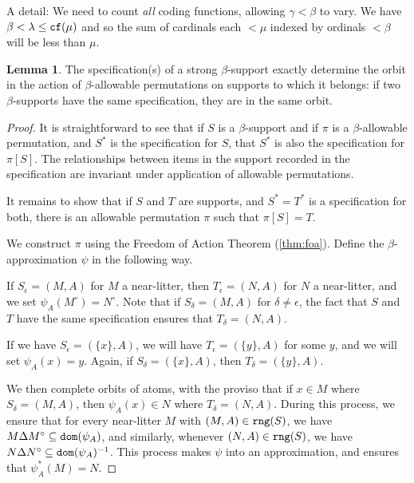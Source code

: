 \documentclass[112pt]{article}
\theoremstyle{definition}
\newtheorem{lemma}[theorem]{Lemma}
\theoremstyle{remark}
\newcommand{\hsuggest}[1]{{\color{magenta}#1}}
\begin{document}
A detail:  We need to count {\em all\/} coding functions, allowing $\gamma<\beta$ to vary.   We have $\beta < \lambda \leq {\tt cf}(\mu)$ and so the sum of cardinals each $<\mu$ indexed by ordinals $<\beta$ will be less than $\mu$.

\begin{lemma}\label{lem:specification_determines_orbit}
The specification(s) of a strong $\beta$-support exactly determine the orbit in the action of $\beta$-allowable permutations on supports to which it belongs:  if two $\beta$-supports have the same specification, they are in the same orbit.
\end{lemma}
\begin{proof}
It is straightforward to see that if $S$ is a $\beta$-support and if $\pi$ is a $\beta$-allowable permutation, and $S^*$ is the  specification for $S$, that $S^*$ is also the specification for $\pi[S]$.  The relationships between items in the support recorded in the specification are invariant under application of allowable permutations.

It remains to show that if $S$ and $T$ are supports, and $S^*=T^*$ is a specification for both, there is an allowable permutation $\pi$ such that $\pi[S]=T$.

We construct $\pi$ using the Freedom of Action Theorem {(\ref{thm:foa})}.
Define the $\beta$-approximation $\psi$ in the following way.

If $S_\epsilon = (M,A)$ for $M$ a near-litter, then $T_\epsilon = (N,A)$ for $N$ a near-litter, and we set $\psi_A(M^\circ) = N^\circ$.
Note that if $S_\delta = (M,A)$ for $\delta \neq \epsilon$, the fact that $S$ and
$T$ have the same specification ensures that $T_\delta = (N,A)$.

If we have $S_\epsilon = (\{x\},A)$, we will have $T_\epsilon = (\{y\},A)$ for some $y$, and we will set $\psi_A(x) = y$.
Again, if $S_\delta = (\{x\},A)$, then $T_\delta = (\{y\},A)$.

We then complete orbits of atoms, with the proviso that if $x \in M$ where $S_\delta = (M, A)$, then $\psi_A(x) \in N$ where $T_\delta = (N, A)$.
During this process, we ensure that for every near-litter $M$ with $(M,A) \in {\tt rng}(S)$, we have $M \Delta M^\circ \subseteq {\tt dom}(\psi_A)$, and similarly, whenever $(N,A) \in {\tt rng}(S)$, we have $N \Delta N^\circ \subseteq {\tt dom}(\psi_A)^{-1}$.
This process makes $\psi$ into an approximation, and ensures that $\psi_A^*(M) = N$.


\end{proof}
\end{document}
